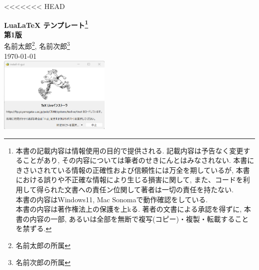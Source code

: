 \documentclass[11pt,a4paper, titlepage]{ltjsarticle}
\newcommand{\記}{\begin{center} 記 \end{center}}
\newcommand{\挨拶}{\noindent 拝啓 \ifcase\month\or 厳寒\or 春寒\or 早春
    \or 陽寒\or 新緑\or 向暑\or 猛暑\or 残暑\or 初秋\or 仲秋\or 晩秋\or 初冬
    \fi の候, ますますご清栄のこととお喜び申し上げます.}
\begin{document}
<<<<<<< HEAD
\begin{titlepage}
    \centering
    \vspace*{\fill}
    \Huge{\textbf{{Lua\LaTeX{} テンプレート\footnote{本書の記載内容は情報使用の目的で提供される. 記載内容は予告なく変更することがあり, その内容については筆者のせきにんとはみなされない. 本書にきさいされている情報の正確性および信頼性には万全を期しているが, 本書における誤りや不正確な情報により生じる損害に関して, また、コードを利用して得られた文書への責任ン位関して著者は一切の責任を持たない. \\本書の内容はWindows11, Mac Sonomaで動作確認をしている. \\本書の内容は著作権法上の保護を上kる. 著者の文書による承認を得ずに, 本書の内容の一部, あるいは全部を無断で複写(コピー)・複製・転載することを禁ずる.} \\第1版}}} \\
    \large{名前太郎\footnote{名前太郎の所属}, 名前次郎\footnote{名前次郎の所属}} \\
    \large{\today} \\
    \vspace*{\fill}
    \includegraphics[width=0.4\textwidth]{img/template.png}
\end{titlepage}
\end{document}
